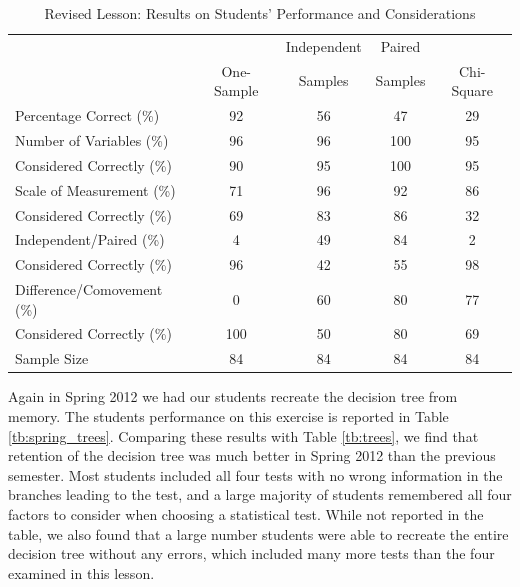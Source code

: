 \documentclass[12pt]{article}
\begin{document}
\begin{table}\caption{Revised Lesson: Results on Students' Performance and Considerations}\label{tb:spring_results} \vspace*{1pc}
\begin{tabular}{p{2.05in}|c|c|c|c}
\multicolumn{1}{c}{}  & \multicolumn{1}{p{0.9in}}{} & \multicolumn{1}{p{0.9in}}{\centering Independent} & \multicolumn{1}{p{0.9in}}{\centering Paired} & \multicolumn{1}{p{0.9in}}{} \\
\multicolumn{1}{c}{}  & \multicolumn{1}{|p{0.9in}|}{\centering One-Sample} & \multicolumn{1}{|p{0.9in}|}{\centering Samples} & \multicolumn{1}{|p{0.9in}|}{\centering Samples} & \multicolumn{1}{|p{0.9in}}{\centering Chi-Square} \\ \hline
Percentage Correct (\%)	&	92 & 56 & 47 & 29 \\  \hline
Number of Variables (\%)    & 96 & 96 & 100 & 95		\\ 
Considered Correctly (\%)   & 90 & 95 & 100 & 95	\\ \hline
Scale of Measurement (\%)  	& 71 & 96 & 92 & 86		\\ 
Considered Correctly (\%)	& 69 & 83 & 86 & 32		\\ \hline
Independent/Paired (\%)	&	4 & 49 & 84 & 2		\\ 
Considered Correctly (\%)	& 96 & 42 & 55 & 98		\\ \hline
Difference/Comovement (\%)  & 0	& 60 & 80 & 77		\\
Considered Correctly (\%)	& 100 & 50 & 80 & 69 		\\ \hline
Sample Size	        &	84 & 84 & 84 & 84	\\  \hline
\end{tabular}
\end{table}

Again in Spring 2012 we had our students recreate the decision tree from memory.  The students performance on this exercise is reported in Table \ref{tb:spring_trees}.  Comparing these results with Table \ref{tb:trees}, we find that retention of the decision tree was much better in Spring 2012 than the previous semester.  Most students included all four tests with no wrong information in the branches leading to the test, and a large majority of students remembered all four factors to consider when choosing a statistical test.  While not reported in the table, we also found that a large number students were able to recreate the entire decision tree without any errors, which included many more tests than the four examined in this lesson.
\end{document}
